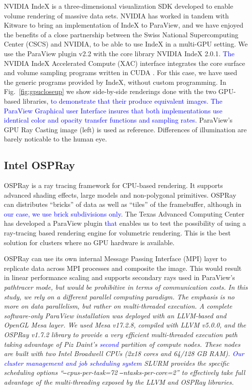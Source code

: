 \documentclass[5p,times]{elsarticle}
\begin{document}
NVIDIA IndeX \cite{NVIDIAIndeX} is a three-dimensional visualization SDK developed to enable
volume rendering of massive data sets. NVIDIA has worked in tandem with Kitware to
bring an implementation of IndeX to ParaView, and we have enjoyed the benefits
of a close partnership between the Swiss National Supercomputing Center (CSCS)
and NVIDIA, to be able to use IndeX in a multi-GPU setting. We use the ParaView
plugin v2.2 with the core library NVIDIA IndeX 2.0.1.
\textcolor{blue}{The} NVIDIA IndeX Accelerated Compute (XAC) interface integrates the core surface
and volume sampling programs written in CUDA \cite{SC18IndexShowcase}.
For this case, we have used the generic programs provided by IndeX, without custom programming.
In Fig.~\ref{fig:gpucloseup} we show side-by-side renderings done with the
two GPU-based libraries, \textcolor{blue}{to demonstrate that their produce equivalent images.
The ParaView Graphical user Interface insures that both implementations use identical
color and opacity transfer functions and sampling rates.} ParaView's
GPU Ray Casting image (left) is used as reference. Differences of
illumination are barely noticable to the human eye.

\subsection{Intel OSPRay}

OSPRay \cite{OSPRay} is a ray tracing framework for CPU-based rendering. It supports advanced 
shading effects, large models and non-polygonal primitives. OSPRay can distributes 
``bricks'' of data as well as ``tiles'' of the framebuffer, although in \textcolor{blue}{our case, we use brick subdivisions only}. The Texas Advanced Computing Center
has developed a ParaView plugin \textcolor{blue}{that} enables us to test the possibility of
using a ray-tracing based rendering engine for volumetric rendering. This is
the best solution for clusters where no GPU hardware is available.

OSPRay can use its own internal Message Passing Interface (MPI) layer to replicate
data across MPI processes and composite the image. This would result in linear
performance scaling and supports secondary rays used in ParaView's \it{pathtracer} \rm mode,
but would be prohibitive in terms of communication costs.
In this study, we rely on a different parallel computing paradigm.
The emphasis is no more on data parallelism, but rather on multi-threaded execution.
A complete \it{software-only} \rm ParaView installation was deployed with an LLVM-based and
OpenGL Mesa layer. We used Mesa v17.2.8, compiled with LLVM v5.0.0, and the
OSPRay v1.7.2 library to provide a very efficient multi-threaded execution path
taking advantage of Piz Daint's \textcolor{blue}{second} partition of compute nodes. These nodes
are built with two Intel Broadwell CPUs (2x18 cores and 64/128 GB RAM). \textcolor{blue}{Our
cluster management and job scheduling system} SLURM provides the specific scheduling options
``\texttt{--}cpus-per-task=72 \texttt{--}ntasks-per-core=2'' to effectively
take full advantage of the multi-threading exposed by the LLVM and OSPRay libraries. 
\end{document}
